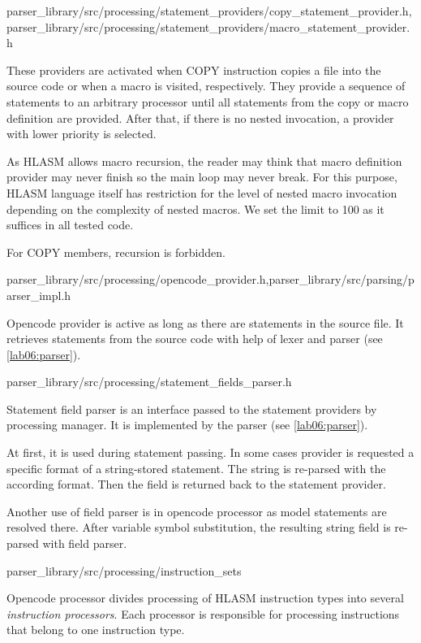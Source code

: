 {parser\_library/src/processing/statement\_providers/copy\_statement\_provider.h,parser\_library/src/processing/statement\_providers/macro\_statement\_provider.h}

These providers are activated when COPY instruction copies a file into the source code or when a macro is visited, respectively. They provide a sequence of statements to an arbitrary processor until all statements from the copy or macro definition are provided. After that, if there is no nested invocation, a provider with lower priority is selected.

As HLASM allows macro recursion, the reader may think that macro definition provider may never finish so the main loop may never break. For this purpose, HLASM language itself has restriction for the level of nested macro invocation depending on the complexity of nested macros. We set the limit to 100 as it suffices in all tested code.

For COPY members, recursion is forbidden.

{parser\_library/src/processing/opencode\_provider.h,parser\_library/src/parsing/parser\_impl.h}

Opencode provider is active as long as there are statements in the source file. It retrieves statements from the source code with help of lexer and parser (see \cref{lab06:parser}).

{parser\_library/src/processing/statement\_fields\_parser.h}
\label{lab06:field_parser}

Statement field parser is an interface passed to the statement providers by processing manager. It is implemented by the parser (see \cref{lab06:parser}).

At first, it is used during statement passing. In some cases provider is requested a specific format of a string-stored statement. The string is re-parsed with the according format. Then the field is returned back to the statement provider. 

Another use of field parser is in opencode processor as model statements are resolved there. After variable symbol substitution, the resulting string field is re-parsed with field parser.

{parser\_library/src/processing/instruction\_sets}
\label{lab06:instr_proc}

Opencode processor divides processing of HLASM instruction types into several \emph{instruction processors}. Each processor is responsible for processing instructions that belong to one instruction type.

